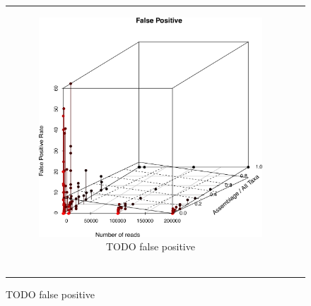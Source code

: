 \begin{figure}
\begin{tabular}{cc}
\begin{subfigure}[b]{0.5\textwidth}
\centering
\includegraphics[width=\textwidth]{../polarfront/falsepositive.png}
\caption{TODO false positive}
\label{fig:minspecvalidationfalsepositive}
\end{subfigure}

\\
\bigskip
\\
\bigskip
\\
\bigskip
\\


\end{tabular}
\end{figure}

